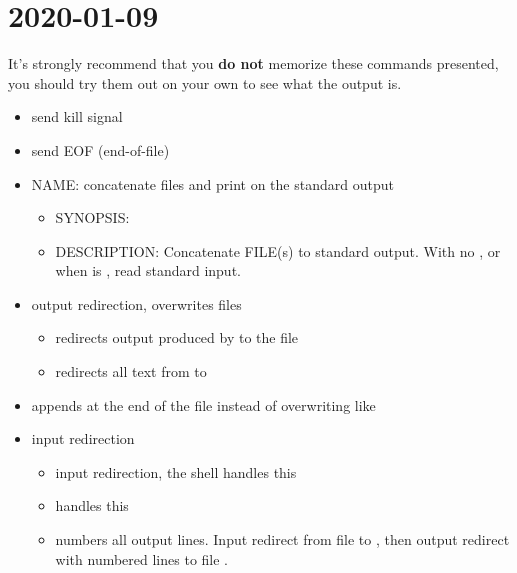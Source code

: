 \section{2020-01-09}
It's strongly recommend that you \textbf{do not} memorize these commands presented,
you should try them out on your own to see what the output is.

\begin{itemize}
      \item {} \textrightarrow{} send kill signal
      \item {} \textrightarrow{} send EOF (end-of-file)
      \item NAME\@:  \textrightarrow{} concatenate files and print on the standard output
            \begin{itemize}
                  \item SYNOPSIS\@: 
                  \item DESCRIPTION\@: Concatenate FILE(s) to standard output.
                        With no , or when  is \code{-}, read standard input.
            \end{itemize}
      \item \code{>} \textrightarrow{} output redirection, overwrites files
            \begin{itemize}
                  \item {} \textrightarrow{} redirects output produced by
                         to the file 
                  \item {} \textrightarrow{} redirects all text from
                         to 
            \end{itemize}
      \item \code{>{}>} \textrightarrow{} appends at the end of the file instead of overwriting like
            \code{>}
      \item \code{<} \textrightarrow{} input redirection
            \begin{itemize}
                  \item {} \textrightarrow{}
                        input redirection, the shell handles this
                  \item {} \textrightarrow{}
                         handles this
                  \item {} \textrightarrow{}
                         numbers all output lines. Input redirect from file  to
                        , then output redirect with numbered lines to file .
            \end{itemize}
\end{itemize}


